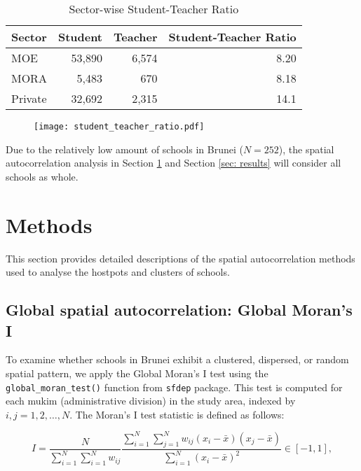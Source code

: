 \documentclass[12pt]{article}
\begin{document}
\begin{table}[htbp]
\centering
\setlength{\tabcolsep}{15pt} %
\begin{tabular}{lrrr}
\hline
\textbf{Sector} & \textbf{Student} & \textbf{Teacher} & \textbf{Student-Teacher Ratio} \\ 
\hline
MOE             & 53,890           & 6,574            & 8.20                           \\
MORA            & 5,483            & 670              & 8.18                           \\
Private         & 32,692           & 2,315            & 14.1                           \\
\hline
\end{tabular}
\caption{Sector-wise Student-Teacher Ratio}
\end{table}

\begin{figure}[h]
\centering
\texttt{[image: student\_teacher\_ratio.pdf]}
\end{figure} 

Due to the relatively low amount of schools in Brunei ($N = 252$), the spatial autocorrelation analysis in Section \ref{sec: methods} and Section \ref{sec: results} will consider all schools as whole.

\section{Methods}
\label{sec: methods}
This section provides detailed descriptions of the spatial autocorrelation methods used to analyse the hostpots and clusters of schools.

\subsection{Global spatial autocorrelation: Global Moran's I}
\label{subsec: gisa}
To examine whether schools in Brunei exhibit a clustered, dispersed, or random spatial pattern, we apply the Global Moran’s I test using the \texttt{global\_moran\_test()} function from \texttt{sfdep} package. This test is computed for each mukim (administrative division) in the study area, indexed by \( i, j = 1, 2, \ldots, N \). The Moran’s I test statistic is defined as follows: 

\begin{equation}
I = \frac{N}{\sum_{i=1}^N \sum_{i=1}^N w_{ij}} \frac{\sum_{i=1}^N \sum_{j=1}^N w_{ij} (x_i - \bar{x})(x_j - \bar{x})}{\sum_{i=1}^N (x_i - \bar{x})^2} \in [-1,1],
\end{equation}
\end{document}
